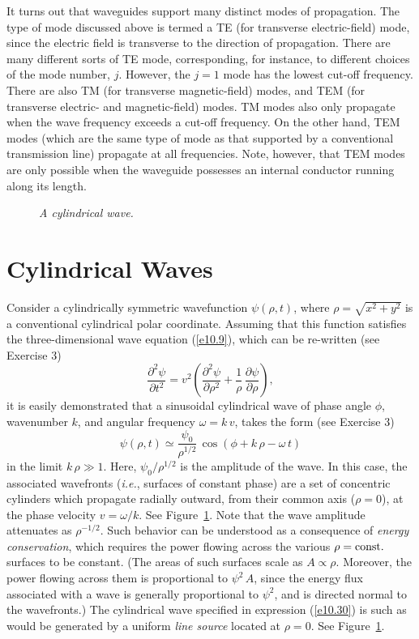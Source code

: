 It turns out that waveguides support many distinct modes of propagation. The type of mode
discussed above is termed a TE (for transverse electric-field) mode, since the electric
field is transverse to the direction of propagation. There are many different sorts of TE mode, corresponding, for instance, to
different choices of the mode number, $j$. However, the $j=1$ mode has the lowest cut-off frequency.
There are also
TM (for transverse magnetic-field) modes, and TEM (for transverse electric- and magnetic-field) modes. 
TM modes also only propagate when the wave frequency exceeds a cut-off frequency. On the other hand, TEM modes (which are the same type of mode as that supported by
a conventional transmission line) propagate at all frequencies. Note, however, that TEM modes are only possible when the waveguide possesses an internal
conductor running along its length. 

\begin{figure}
\epsfysize=3in
\centerline{}
\caption{\em A cylindrical wave.}\label{f10.4}   
\end{figure}

\section{Cylindrical Waves}\label{s10.4}
Consider a cylindrically symmetric wavefunction $\psi(\rho,t)$, where $\rho= \sqrt{x^2+y^2}$ is a conventional
cylindrical polar coordinate. Assuming that this function satisfies the three-dimensional wave equation (\ref{e10.9}), which
can be re-written (see Exercise 3)
\begin{equation}
\frac{\partial^2\psi}{\partial t^2} = v^2\left(\frac{\partial^2\psi}{\partial \rho^2} + \frac{1}{\rho}\,\frac{\partial\psi}{\partial\rho}\right),
\end{equation}
it is easily demonstrated that a sinusoidal cylindrical wave of phase angle $\phi$, wavenumber $k$, and angular frequency $\omega=k\,v$, takes the form (see Exercise 3)
\begin{equation}\label{e10.30}
\psi(\rho,t) \simeq \frac{\psi_0}{\rho^{1/2}}\,\cos(\phi+k\,\rho-\omega\,t)
\end{equation}
in the limit $k\,\rho\gg 1$. Here, $\psi_0/\rho^{1/2}$ is the amplitude of the wave. 
In this case, the associated wavefronts ({\em i.e.}, surfaces of constant phase) are a set of concentric cylinders which
propagate radially outward, from their common axis ($\rho=0$), at the phase velocity $v=\omega/k$. See Figure~\ref{f10.4}. Note that the wave amplitude attenuates as $\rho^{-1/2}$.
Such behavior  can be understood as a  consequence of {\em energy conservation}, which requires the power flowing across the various $\rho={\rm const.}$ surfaces to be
constant. (The areas of such surfaces scale as $A\propto \rho$.
Moreover, the power flowing across them  is proportional to $\psi^2\,A$, since the  energy flux associated with
a wave is generally proportional to $\psi^2$, and is directed normal to the wavefronts.)
 The cylindrical wave specified in expression (\ref{e10.30}) is such as would be generated by
a uniform {\em line source}\/ located at $\rho=0$. See Figure~\ref{f10.4}.


